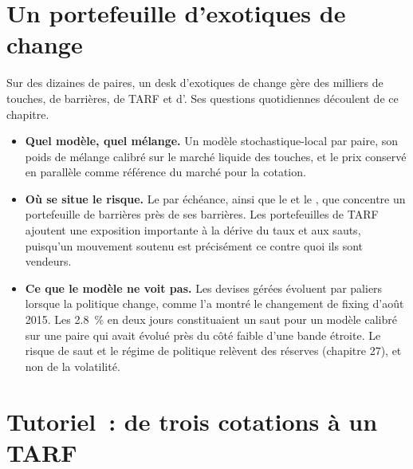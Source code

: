 \section{Un portefeuille d'exotiques de change}

Sur des dizaines de paires, un desk d'exotiques de change gère des milliers de touches, de barrières, de TARF et d'. Ses questions quotidiennes découlent
de ce chapitre.
\begin{itemize}
\item \textbf{Quel modèle, quel mélange.} Un modèle stochastique-local par paire, son poids de mélange calibré sur le marché liquide des touches, et
le prix  conservé en parallèle comme référence du marché pour la cotation.
\item \textbf{Où se situe le risque.} Le  par échéance, ainsi que le  et le , que concentre un portefeuille de barrières près de ses barrières. Les portefeuilles de TARF ajoutent
une exposition importante à la dérive du taux et aux sauts, puisqu'un mouvement soutenu est précisément ce contre quoi ils sont vendeurs.
\item \textbf{Ce que le modèle ne voit pas.} Les devises gérées évoluent par paliers lorsque la politique change, comme l'a montré le changement de fixing d'août 2015.
Les 2.8~\% en deux jours constituaient un saut pour un modèle calibré sur une paire qui avait évolué près du côté faible d'une bande étroite. Le risque de saut et le
régime de politique relèvent des réserves (chapitre 27), et non de la volatilité.
\end{itemize}

\section{Tutoriel~: de trois cotations à un TARF}\label{tut:dv:fx-derivatives:tut}

